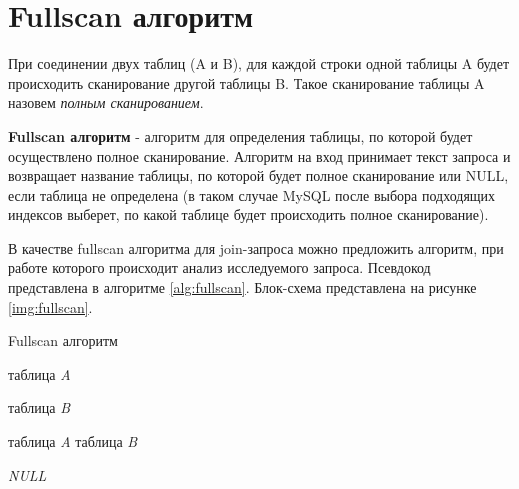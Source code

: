 \section{Fullscan алгоритм}

При соединении двух таблиц (A и B), для каждой строки одной таблицы A будет происходить сканирование другой таблицы B. Такое сканирование таблицы A назовем \textit{полным сканированием}. 

\textbf{Fullscan алгоритм} - алгоритм для определения таблицы, по которой будет осуществлено полное сканирование. Алгоритм на вход принимает текст запроса и возвращает название таблицы, по которой будет полное сканирование или NULL, если таблица не определена (в таком случае MySQL после выбора подходящих индексов выберет, по какой таблице будет происходить полное сканирование).

В качестве fullscan алгоритма для join-запроса можно предложить алгоритм, при работе которого происходит анализ исследуемого запроса. Псевдокод представлена в алгоритме \ref{alg:fullscan}. Блок-схема представлена на рисунке \ref{img:fullscan}.

\begin{algorithm}[h!]
\caption{Fullscan алгоритм}
\label{alg:fullscan}
\begin{algorithmic}[1]
 
        \Else
            \State \Return таблица \textit{A}
        \EndIf
    \EndIf
    \Statex 
    
        \Else
            \State \Return таблица \textit{B}
        \EndIf
    \EndIf
    \Statex 

            \State \Return таблица \textit{A}
            \State \Return таблица \textit{B}
        \EndIf
    \EndIf
    \Statex 

    \State \Return \textit{NULL}
\EndFunction
 
\end{algorithmic}
\end{algorithm}

